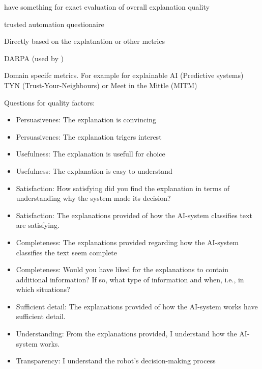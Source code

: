 \cite{knijnenburg2012explaining, hernandez-bocanegra_effects_2020} have something for exact evaluation of overall explanation quality

\cite{weitz_you_2019} trusted automation questionaire

Directly based on the explatnation \cite{sato_action-triggering_2019} or other metrics 

DARPA (used by \cite{martin_evaluating_2021}) \cite{gunning2019darpa}

Domain specifc metrics. For example for explainable AI (Predictive systems) TYN (Trust-Your-Neighbours) or Meet in the Mittle (MITM) \cite{martin_evaluating_2021}

Questions for quality factors:

\begin{itemize}
    \item Persuasivenes: The explanation is convincing \cite{sato_action-triggering_2019, sato_context_nodate}
    \item Persuasivenes: The explanation trigers interest \cite{sato_action-triggering_2019, sato_context_nodate}
    \item Usefulness: The explanation is usefull for choice \cite{sato_action-triggering_2019, sato_context_nodate}
    \item Usefulness: The explanation is easy to understand \cite{sato_action-triggering_2019, sato_context_nodate}
    \item Satisfaction: How satisfying did you find the explanation in terms of understanding why the system made its decision? \cite{riveiro_thats_2021}
    \item Satisfaction: The explanations provided of how the AI-system classifies text are satisfying. \cite{riveiro_thats_2021}
    \item Completeness: The explanations provided regarding how the AI-system classifies the text seem complete
 \cite{riveiro_thats_2021}
    \item Completeness: Would you have liked for the explanations to contain additional information? If so, what type of information and when, i.e., in which situations?
 \cite{riveiro_thats_2021}
    \item Sufficient detail: The explanations provided of how the AI-system works have sufficient detail.
 \cite{riveiro_thats_2021}
    \item Understanding: From the explanations provided, I understand how the AI-system works.
 \cite{riveiro_thats_2021}
 \item Transparency: I understand the robot’s decision-making process \cite{wang_is_2018}

\end{itemize}
